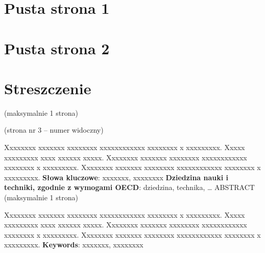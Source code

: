 \documentclass[10pt,twoside,a4paper]{report}
\begin{document}
\chapter*{Pusta strona 1}
\chapter*{Pusta strona 2}
\renewcommand{\familydefault}{\sfdefault}
\chapter*{Streszczenie}
(maksymalnie 1 strona)\par
(strona nr 3 – numer widoczny)\par
Xxxxxxxx xxxxxxx xxxxxxxx xxxxxxxxxxxx xxxxxxxx x xxxxxxxxx. Xxxxx xxxxxxxxx xxxx xxxxxx xxxxx. Xxxxxxxx xxxxxxx xxxxxxxx xxxxxxxxxxxx xxxxxxxx x xxxxxxxxx. Xxxxxxxx xxxxxxx xxxxxxxx xxxxxxxxxxxx xxxxxxxx x xxxxxxxxx. 
\newline\textbf{Słowa kluczowe}: xxxxxxx, xxxxxxxx
\newline\textbf{Dziedzina nauki i techniki, zgodnie z wymogami OECD}: 
dziedzina, technika, …
\newline ABSTRACT (maksymalnie 1 strona)
\par Xxxxxxxx xxxxxxx xxxxxxxx xxxxxxxxxxxx xxxxxxxx x xxxxxxxxx. Xxxxx xxxxxxxxx xxxx xxxxxx xxxxx. Xxxxxxxx xxxxxxx xxxxxxxx xxxxxxxxxxxx xxxxxxxx x xxxxxxxxx. Xxxxxxxx xxxxxxx xxxxxxxx xxxxxxxxxxxx xxxxxxxx x xxxxxxxxx.
\newline\textbf{Keywords}: xxxxxxx, xxxxxxxx

\tableofcontents
\end{document}
